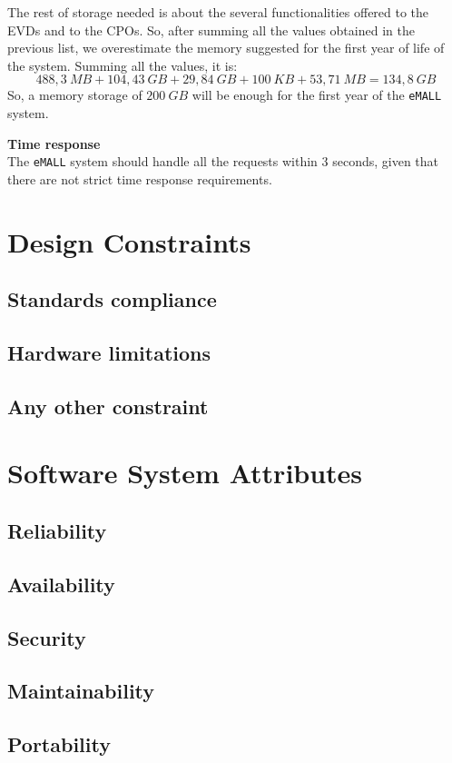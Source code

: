 The rest of storage needed is about the several functionalities offered to the EVDs and to the CPOs.
So, after summing all the values obtained in the previous list, we overestimate the memory suggested for the first year
of life of the system.
Summing all the values, it is:
\[
    488,3\ MB + 104,43\ GB + 29,84\ GB + 100\ KB + 53,71\ MB = 134,8\ GB
\]
So, a memory storage of $200\ GB$ will be enough for the first year of the \verb|eMALL| system.

\textbf{Time response} \\
The \verb|eMALL| system should handle all the requests within 3 seconds, given that there are not strict time response requirements.


\section{Design Constraints}
\label{sec:design_constraints}%

\subsection{Standards compliance}
\label{subsec:standards_compliance}%

\subsection{Hardware limitations}
\label{subsec:hardware_limitations}%

\subsection{Any other constraint}
\label{subsec:any_other_constraint}%


\section{Software System Attributes}
\label{sec:software_system_attributes}%

\subsection{Reliability}
\label{subsec:reliability}%

\subsection{Availability}
\label{subsec:availability}%

\subsection{Security}
\label{subsec:security}%

\subsection{Maintainability}
\label{subsec:maintainability}%

\subsection{Portability}
\label{subsec:portability}%

